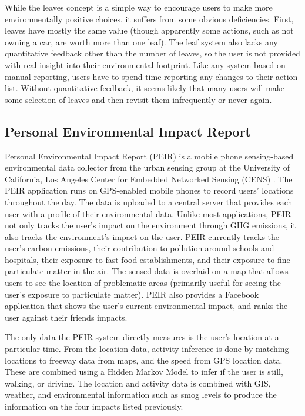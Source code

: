 While the leaves concept is a simple way to encourage users to make more environmentally positive choices, it suffers from some obvious deficiencies. First, leaves have mostly the same value (though apparently some actions, such as not owning a car, are worth more than one leaf). The leaf system also lacks any quantitative feedback other than the number of leaves, so the user is not provided with real insight into their environmental footprint. Like any system based on manual reporting, users have to spend time reporting any changes to their action list. Without quantitative feedback, it seems likely that many users will make some selection of leaves and then revisit them infrequently or never again.

\subsection{Personal Environmental Impact Report}

Personal Environmental Impact Report (PEIR) is a mobile phone sensing-based environmental data collector from the urban sensing group at the University of California, Los Angeles Center for Embedded Networked Sensing (CENS) \cite{peir-website, agapie-2008-seeing-our-signals}. The PEIR application runs on GPS-enabled mobile phones to record users' locations throughout the day. The data is uploaded to a central server that provides each user with a profile of their environmental data. Unlike most applications, PEIR not only tracks the user's impact on the environment through GHG emissions, it also tracks the environment's impact on the user. PEIR currently tracks the user's carbon emissions, their contribution to pollution around schools and hospitals, their exposure to fast food establishments, and their exposure to fine particulate matter in the air. The sensed data is overlaid on a map that allows users to see the location of problematic areas (primarily useful for seeing the user's exposure to particulate matter). PEIR also provides a Facebook application that shows the user's current environmental impact, and ranks the user against their friends impacts.

The only data the PEIR system directly measures is the user's location at a particular time. From the location data, activity inference is done by matching locations to freeway data from maps, and the speed from GPS location data. These are combined using a Hidden Markov Model to infer if the user is still, walking, or driving. The location and activity data is combined with GIS, weather, and environmental information such as smog levels to produce the information on the four impacts listed previously.

